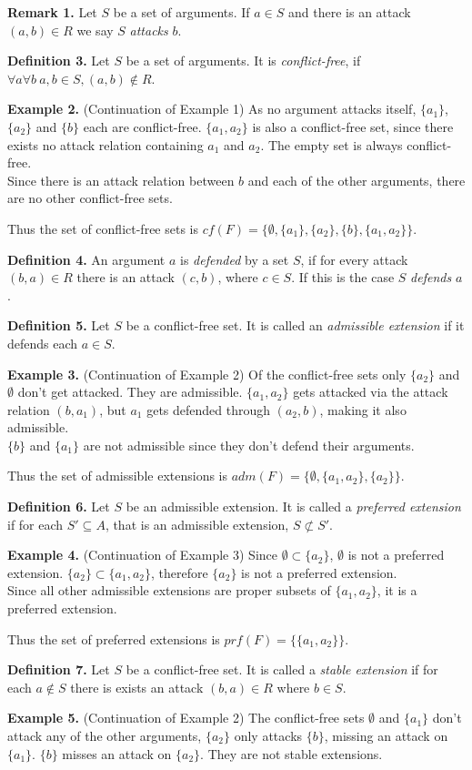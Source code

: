 \documentclass{article}
\newcommand{\nl}{\par\medskip\noindent}
\newcommand{\dl}{\par\bigskip\noindent}
\begin{document}
\noindent
\textbf{Remark 1.} Let $S$ be a set of arguments. If $a\in S$ and there is an attack $(a,b)\in R$ we say $S$ \emph{attacks} $b$.\dl
\textbf{Definition 3.} Let $S$ be a set of arguments. It is \emph{conflict-free}, if $\forall a \forall b\ a,b\in S, (a,b)\notin R$.\dl
\textbf{Example 2.} (Continuation of Example 1) As no argument attacks itself, $\{a_1\}$, $\{a_2\}$ and $\{b\}$ each are conflict-free. $\{a_1,a_2\}$ is also a conflict-free set, since there exists no attack relation containing $a_1$ and $a_2$. The empty set is always conflict-free.\\
Since there is an attack relation between $b$ and each of the other arguments, there are no other conflict-free sets.\nl
Thus the set of conflict-free sets is $cf(F)=\{\emptyset,\{a_1\},\{a_2\},\{b\},\{a_1,a_2\}\}$.\dl
\textbf{Definition 4.} An argument $a$ is \emph{defended} by a set $S$, if for every attack $(b,a)\in R$ there is an attack $(c,b)$, where $c\in S$. If this is the case $S$ \emph{defends} $a$.\dl
\textbf{Definition 5.} Let $S$ be a conflict-free set. It is called an \emph{admissible extension} if it defends each $a\in S$.\dl
\textbf{Example 3.} (Continuation of Example 2) Of the conflict-free sets only $\{a_2\}$ and \(\emptyset\) don't get attacked. They are admissible. $\{a_1,a_2\}$ gets attacked via the attack relation $(b,a_1)$, but $a_1$ gets defended through $(a_2,b)$, making it also admissible.\\
$\{b\}$ and $\{a_1\}$ are not admissible since they don't defend their arguments.\nl
Thus the set of admissible extensions is $adm(F)=\{\emptyset,\{a_1,a_2\},\{a_2\}\}$.\dl
\textbf{Definition 6.} Let $S$ be an admissible extension. It is called a \emph{preferred extension} if for each $S'\subseteq A$, that is an admissible extension, $S\not\subset S'$.\dl
\textbf{Example 4.} (Continuation of Example 3) Since $\emptyset\subset\{a_2\}$, \(\emptyset\) is not a preferred extension. $\{a_2\}\subset\{a_1,a_2\}$, therefore $\{a_2\}$ is not a preferred extension.\\
Since all other admissible extensions are proper subsets of $\{a_1,a_2\}$, it is a preferred extension.\nl
Thus the set of preferred extensions is $prf(F)=\{\{a_1,a_2\}\}$.\dl
\textbf{Definition 7.} Let $S$ be a conflict-free set. It is called a \emph{stable extension} if for each $a\not\in S$ there is exists an attack $(b,a)\in R$ where $b\in S$.\dl
\textbf{Example 5.} (Continuation of Example 2) The conflict-free sets $\emptyset$ and $\{a_1\}$ don't attack any of the other arguments, $\{a_2\}$ only attacks $\{b\}$, missing an attack on $\{a_1\}$. $\{b\}$ misses an attack on $\{a_2\}$. They are not stable extensions.\\
\end{document}
